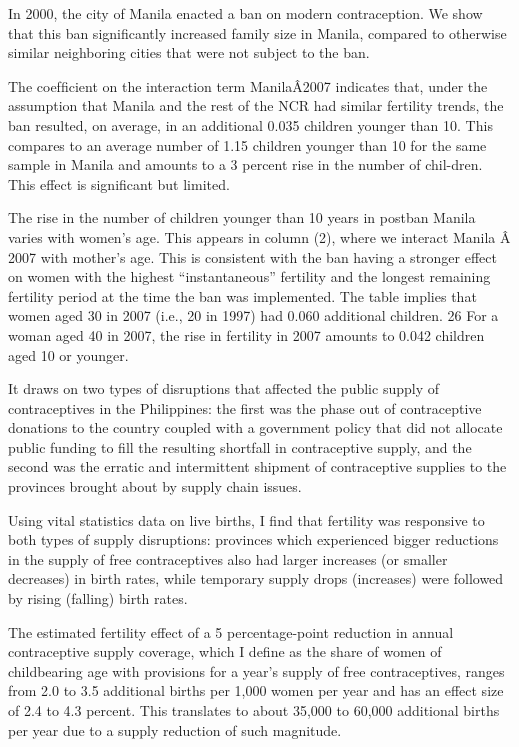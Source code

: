 \documentclass[letterpaper,12pt]{article}
\begin{document}
 


\citet{Dumas2017}

In 2000, the city of Manila enacted a ban on modern contraception. We
show that this ban signiﬁcantly increased family size in Manila,
compared to otherwise similar neighboring cities that were not subject
to the ban.

The coefﬁcient on the interaction term ManilaÂ2007 indicates that, under
the assumption that Manila and the rest of the NCR had similar fertility
trends, the ban resulted, on average, in an additional 0.035 children
younger than 10. This compares to an average number of 1.15 children
younger than 10 for the same sample in Manila and amounts to a 3 percent
rise in the number of chil-dren. This effect is signiﬁcant but limited.

The rise in the number of children younger than 10 years in postban
Manila varies with women’s age. This appears in column (2), where we
interact Manila Â 2007 with mother’s age. This is consistent with the
ban having a stronger effect on women with the highest “instantaneous”
fertility and the longest remaining fertility period at the time the ban
was implemented. The table implies that women aged 30 in 2007 (i.e., 20
in 1997) had 0.060 additional children. 26 For a woman aged 40 in 2007,
the rise in fertility in 2007 amounts to 0.042 children aged 10 or
younger.

\citep{Salas2014}

It draws on two types of disruptions that affected the public supply of
contraceptives in the Philippines: the ﬁrst was the phase out of
contraceptive donations to the country coupled with a government policy
that did not allocate public funding to ﬁll the resulting shortfall in
contraceptive supply, and the second was the erratic and intermittent
shipment of contraceptive supplies to the provinces brought about by
supply chain issues.

Using vital statistics data on live births, I ﬁnd that fertility was
responsive to both types of supply disruptions: provinces which
experienced bigger reductions in the supply of free contraceptives also
had larger increases (or smaller decreases) in birth rates, while
temporary supply drops (increases) were followed by rising (falling)
birth rates.

The estimated fertility effect of a 5 percentage-point reduction in
annual contraceptive supply coverage, which I deﬁne as the share of
women of childbearing age with provisions for a year’s supply of free
contraceptives, ranges from 2.0 to 3.5 additional births per 1,000 women
per year and has an effect size of 2.4 to 4.3 percent. This translates
to about 35,000 to 60,000 additional births per year due to a supply
reduction of such magnitude.
\end{document}
